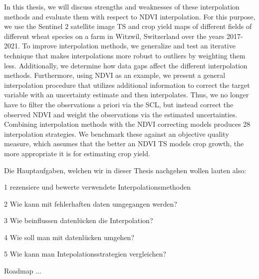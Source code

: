 

In this thesis, we will discuss strengths and weaknesses of these interpolation methods and evaluate them with respect to NDVI interpolation. For this purpose, we use the Sentinel 2 satellite image {TS} and crop yield maps of different fields of different wheat species on a farm in Witzwil, Switzerland over the years 2017-2021.
To improve interpolation methods, we generalize and test an iterative technique that makes interpolations more robust to outliers by weighting them less. Additionally, we determine how data gaps affect the different interpolation methods. Furthermore, using NDVI as an example, we present a general interpolation procedure that utilizes additional information to correct the target variable with an uncertainty estimate and then interpolates. Thus, we no longer have to filter the observations a priori via the SCL, but instead correct the observed NDVI and weight the observations via the estimated uncertainties. Combining interpolation methods with the NDVI correcting models produces 28 interpolation strategies. We benchmark these against an objective quality measure, which assumes that the better an NDVI TS models crop growth, the more appropriate it is for estimating crop yield.

Die Hauptaufgaben, welchen wir in dieser Thesis nachgehen wollen lauten also:
\begin{Nenumerate}
    \item 1 rezensiere und bewerte verwendete Interpolationsmethoden
    \item 2 Wie kann mit fehlerhaften daten umgegangen werden?
    \item 3 Wie beinflussen datenlücken die Interpolation?
    \item 4 Wie soll man mit datenlücken umgehen?
    \item 5 Wie kann man Intepolationsstrategien vergleichen?
\end{Nenumerate}

Roadmap ...




